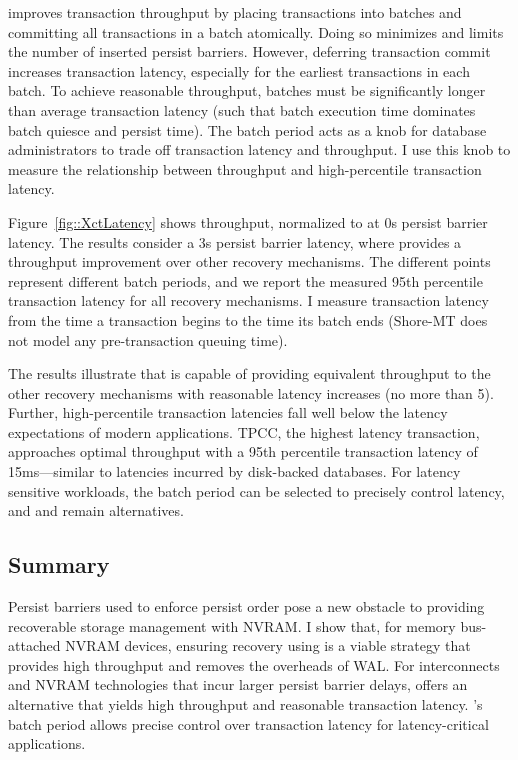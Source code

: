 

\GroupCommit improves transaction throughput by placing transactions into batches and committing all transactions in a batch atomically.
Doing so minimizes and limits the number of inserted persist barriers.
However, deferring transaction commit increases transaction latency, especially for the earliest transactions in each batch.
To achieve reasonable throughput, batches must be significantly longer than average transaction latency (such that batch execution time dominates batch quiesce and persist time).
The batch period acts as a knob for database administrators to trade off transaction latency and throughput.
I use this knob to measure the relationship between throughput and high-percentile transaction latency.

Figure~\ref{fig::XctLatency} shows throughput, normalized to \InPlace at 0\textmu s persist barrier latency.
The results consider a 3\textmu s persist barrier latency, where \GroupCommit provides a throughput improvement over other recovery mechanisms.
The different \GroupCommit points represent different batch periods, and we report the measured 95th percentile transaction latency for all recovery mechanisms.
I measure transaction latency from the time a transaction begins to the time its batch ends (Shore-MT does not model any pre-transaction queuing time).

The results illustrate that \GroupCommit is capable of providing equivalent throughput to the other recovery mechanisms with reasonable latency increases (no more than 5\texttimes).
Further, high-percentile transaction latencies fall well below the latency expectations of modern applications.
TPCC, the highest latency transaction, approaches optimal throughput with a 95th percentile transaction latency of 15ms---similar to latencies incurred by disk-backed databases.
For latency sensitive workloads, the batch period can be selected to precisely control latency, and \InPlace and \NVDisk remain alternatives.

\subsection{Summary}
\label{sec:OLTP_eval:Persists:Summary}
Persist barriers used to enforce persist order pose a new obstacle to providing recoverable storage management with NVRAM.
I show that, for memory bus-attached NVRAM devices, ensuring recovery using \InPlace is a viable strategy that provides high throughput and removes the overheads of WAL.
For interconnects and NVRAM technologies that incur larger persist barrier delays, \GroupCommit offers an alternative that yields high throughput and reasonable transaction latency.
\GroupCommit's batch period allows precise control over transaction latency for latency-critical applications.

